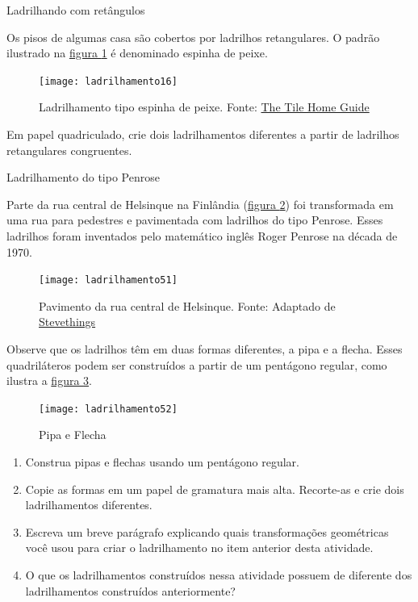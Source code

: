 \begin{task}{Ladrilhando com retângulos} \label{at_outros1}

Os pisos de algumas casa são cobertos por ladrilhos retangulares. O padrão ilustrado na \hyperref[peixe]{figura \ref{peixe}} é denominado espinha de peixe. 

	\begin{figure}[H]
	\centering
	\texttt{[image: ladrilhamento16]}
	\caption{Ladrilhamento tipo espinha de peixe. Fonte: \href{http://www.tilehomeguide.com/tile-patterns-the-ultimate-quick-read-beginners-guide-including-secrets-of-tile-professionals-revealed/}{The Tile Home Guide}}
	\label{peixe}
	\end{figure}

 Em papel quadriculado, crie dois ladrilhamentos  diferentes a partir de ladrilhos retangulares congruentes.

\end{task}
\clearpage
\begin{task}{Ladrilhamento do tipo Penrose}\label{at_outros2}

Parte da rua central de Helsinque na Finlândia (\hyperref[pen1]{figura \ref{pen1}}) foi transformada em uma rua para pedestres e pavimentada com ladrilhos do tipo Penrose. Esses ladrilhos foram inventados pelo matemático inglês Roger Penrose na década de 1970.

\begin{figure}[H]
	\centering
	\texttt{[image: ladrilhamento51]}
	\caption{Pavimento da rua central de Helsinque. Fonte: Adaptado de  \href{https://stevethings.wordpress.com/2015/12/21/penrose-tiling/} {Stevethings} }
	\label{pen1}
\end{figure}

Observe que os ladrilhos têm em duas formas diferentes, a pipa e a flecha. Esses quadriláteros podem ser construídos a partir de um pentágono regular, como ilustra a \hyperref[pen2]{figura \ref{pen2}}.

	\begin{figure}[H]
	\centering
	\texttt{[image: ladrilhamento52]}
	\caption{Pipa e Flecha}
	\label{pen2}
	\end{figure}
	
	\begin{enumerate}
		\item Construa pipas e flechas usando um pentágono regular.
		\item Copie as formas em um papel de gramatura mais alta. Recorte-as e crie dois ladrilhamentos diferentes.
		\item Escreva um breve parágrafo explicando quais transformações geométricas você usou para criar o ladrilhamento no item anterior desta atividade. 
		\item O que os ladrilhamentos construídos nessa atividade possuem de diferente dos ladrilhamentos construídos anteriormente?
	\end{enumerate}
	
\end{task}


